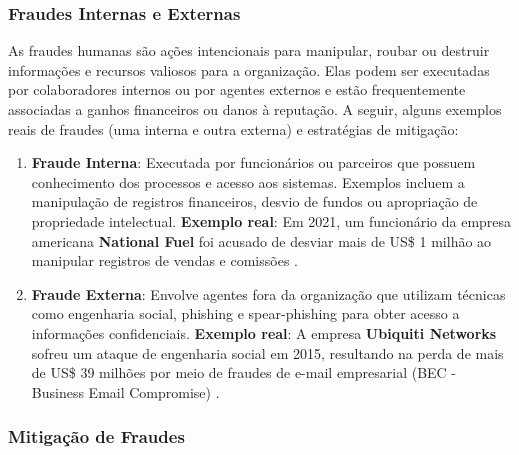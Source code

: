 \documentclass[12pt,oneside,a4paper,article]{abntex2}
\begin{document}
\subsubsection{\textbf{Fraudes Internas e Externas}}

As fraudes humanas são ações intencionais para manipular, roubar ou destruir informações e recursos valiosos para a organização. Elas podem ser executadas por colaboradores internos ou por agentes externos e estão frequentemente associadas a ganhos financeiros ou danos à reputação. A seguir, alguns exemplos reais de fraudes (uma interna e outra externa) e estratégias de mitigação:

\begin{enumerate}
    \item \textbf{Fraude Interna}: Executada por funcionários ou parceiros que possuem conhecimento dos processos e acesso aos sistemas. Exemplos incluem a manipulação de registros financeiros, desvio de fundos ou apropriação de propriedade intelectual. \textbf{Exemplo real}: Em 2021, um funcionário da empresa americana \textbf{National Fuel} foi acusado de desviar mais de US\$ 1 milhão ao manipular registros de vendas e comissões \cite{nationalfuel}.
    
    \item \textbf{Fraude Externa}: Envolve agentes fora da organização que utilizam técnicas como engenharia social, phishing e spear-phishing para obter acesso a informações confidenciais. \textbf{Exemplo real}: A empresa \textbf{Ubiquiti Networks} sofreu um ataque de engenharia social em 2015, resultando na perda de mais de US\$ 39 milhões por meio de fraudes de e-mail empresarial (BEC - Business Email Compromise) \cite{ubiquiti}.
\end{enumerate}

\subsubsection{\textbf{Mitigação de Fraudes}}
\end{document}
